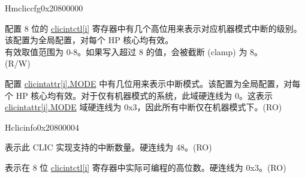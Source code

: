 \begin{register}{H}{{mcliccfg}}{0x20800000}\label{regdesc:MCLICCFG_REG}
%
%
%
%
\regnewline%
\begin{regdesc}
\begin{reglist}
\label{fielddesc:MCLICCFG_MNLBITS}\item [MNLBITS] 配置 8 位的 \hyperref[regdesc:MCLICINTCTL_REG_i]{clicintctl[i]} 寄存器中有几个高位用来表示对应机器模式中断的级别。该配置为全局配置，对每个 HP 核心均有效。\\
有效取值范围为 0-8。如果写入超过 8 的值，会被截断 (clamp) 为 8。\\
(R/W)
\label{fielddesc:MCLICCFG_NMBITS}\item [NMBITS] 配置 \hyperref[fielddesc:MCLICINTATTR_i_MODE]{clicintattr[i].MODE} 中有几位用来表示中断模式。该配置为全局配置，对每个 HP 核心均有效。对于仅有机器模式的系统，此域硬连线为 0。这表示 \hyperref[fielddesc:MCLICINTATTR_i_MODE]{clicintattr[i].MODE} 域硬连线为 0x3，因此所有中断仅在机器模式下。(RO) \\
\end{reglist}
\end{regdesc}
\end{register}

\begin{register}{H}{{clicinfo}}{0x20800004}\label{regdesc:CLICINFO_REG}
%
%
%
%
\regnewline%
\begin{regdesc}
\begin{reglist}
\label{fielddesc:CLICINFO_NUM_INTERRUPTS}\item [NUM\_INTERRUPTS] 表示此 CLIC 实现支持的中断数量。硬连线为 48。(RO)
\label{fielddesc:CLICINFO_CLICINTCTLBITS}\item [CLICINTCTLBITS] 表示在 8 位 \hyperref[regdesc:MCLICINTCTL_REG_i]{clicintctl[i]} 寄存器中实际可编程的高位数。硬连线为 0x3。(RO)
\end{reglist}
\end{regdesc}
\end{register}


